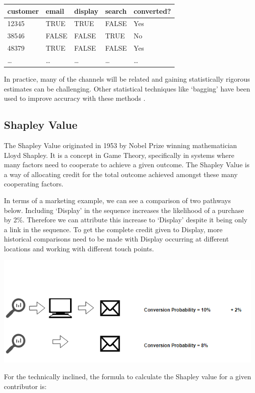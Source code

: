 \documentclass[]{book}
\begin{document}
\begin{longtable}[]{@{}lllll@{}}
\toprule
customer & email & display & search & converted?\tabularnewline
\midrule
\endhead
12345 & TRUE & TRUE & FALSE & Yes\tabularnewline
38546 & FALSE & FALSE & TRUE & No\tabularnewline
48379 & TRUE & FALSE & FALSE & Yes\tabularnewline
\ldots{} & \ldots{} & \ldots{} & \ldots{} & \ldots{}\tabularnewline
\bottomrule
\end{longtable}

In practice, many of the channels will be related and gaining
statistically rigorous estimates can be challenging. Other statistical
techniques like `bagging' have been used to improve accuracy with these
methods \citep{shao2011data}.

\hypertarget{shapley-value}{\subsection{Shapley
Value}\label{shapley-value}}

The Shapley Value \citep{shapley1953value} originated in 1953 by Nobel
Prize winning mathematician Lloyd Shapley. It is a concept in Game
Theory, specifically in systems where many factors need to cooperate to
achieve a given outcome. The Shapley Value is a way of allocating credit
for the total outcome achieved amongst these many cooperating factors.

In terms of a marketing example, we can see a comparison of two pathways
below. Including `Display' in the sequence increases the likelihood of a
purchase by 2\%. Therefore we can attribute this increase to `Display'
despite it being only a link in the sequence. To get the complete credit
given to Display, more historical comparisons need to be made with
Display occurring at different locations and working with different
touch points.

\includegraphics[width=6.28in]{img/shapley}

For the technically inclined, the formula to calculate the Shapley value
for a given contributor is:
\end{document}

